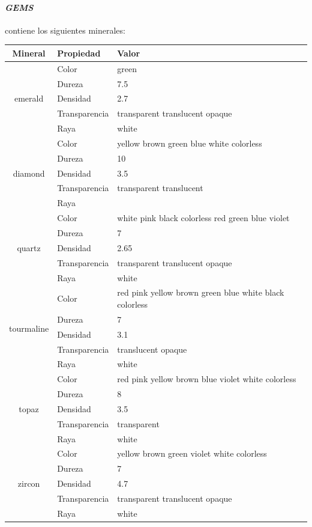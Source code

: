\documentclass[a4paper,10pt]{article}
\begin{document}
\paragraph{\textit{GEMS}} contiene los siguientes minerales:


\hspace{-1.2cm}
\begin{tabular}{|c|l|l|}
    \hline
    Mineral & Propiedad & Valor \\ \hline
    \multirow{5}{*}{emerald} 
        & Color &  green \\
        & Dureza &  7.5 \\
        & Densidad &  2.7 \\
        & Transparencia & transparent translucent opaque\\
        & Raya &  white\\\hline
    \multirow{5}{*}{diamond} 
        & Color &  yellow brown green blue white colorless \\
        & Dureza &  10 \\
        & Densidad &  3.5 \\
        & Transparencia &  transparent translucent \\
        & Raya &  \\\hline
    \multirow{5}{*}{quartz} 
        & Color & white pink black colorless red green blue violet \\
        & Dureza & 7 \\
        & Densidad & 2.65 \\
        & Transparencia & transparent translucent opaque \\
        & Raya & white \\ \hline
    \multirow{5}{*}{tourmaline} 
        & Color & red pink yellow brown green blue white black colorless \\
        & Dureza & 7 \\
        & Densidad & 3.1 \\
        & Transparencia & translucent opaque \\
        & Raya & white \\ \hline
    \multirow{5}{*}{topaz} 
        & Color & red pink yellow brown blue violet white colorless \\
        & Dureza & 8 \\
        & Densidad & 3.5 \\
        & Transparencia & transparent \\
        & Raya & white \\ \hline
    \multirow{5}{*}{zircon} 
        & Color & yellow brown green violet white colorless \\
        & Dureza & 7 \\
        & Densidad & 4.7 \\
        & Transparencia & transparent translucent opaque \\
        & Raya & white \\ \hline
    
\end{tabular}
        
\end{document}
